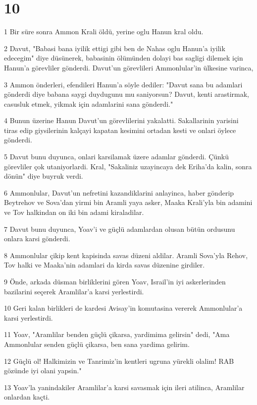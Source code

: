 \chapter{10}

\par 1 Bir süre sonra Ammon Krali öldü, yerine oglu Hanun kral oldu.
\par 2 Davut, "Babasi bana iyilik ettigi gibi ben de Nahas oglu Hanun'a iyilik edecegim" diye düsünerek, babasinin ölümünden dolayi bas sagligi dilemek için Hanun'a görevliler gönderdi. Davut'un görevlileri Ammonlular'in ülkesine varinca,
\par 3 Ammon önderleri, efendileri Hanun'a söyle dediler: "Davut sana bu adamlari gönderdi diye babana saygi duydugunu mu saniyorsun? Davut, kenti arastirmak, casusluk etmek, yikmak için adamlarini sana gönderdi."
\par 4 Bunun üzerine Hanun Davut'un görevlilerini yakalatti. Sakallarinin yarisini tiras edip giysilerinin kalçayi kapatan kesimini ortadan kesti ve onlari öylece gönderdi.
\par 5 Davut bunu duyunca, onlari karsilamak üzere adamlar gönderdi. Çünkü görevliler çok utaniyorlardi. Kral, "Sakaliniz uzayincaya dek Eriha'da kalin, sonra dönün" diye buyruk verdi.
\par 6 Ammonlular, Davut'un nefretini kazandiklarini anlayinca, haber gönderip Beytrehov ve Sova'dan yirmi bin Aramli yaya asker, Maaka Krali'yla bin adamini ve Tov halkindan on iki bin adami kiraladilar.
\par 7 Davut bunu duyunca, Yoav'i ve güçlü adamlardan olusan bütün ordusunu onlara karsi gönderdi.
\par 8 Ammonlular çikip kent kapisinda savas düzeni aldilar. Aramli Sova'yla Rehov, Tov halki ve Maaka'nin adamlari da kirda savas düzenine girdiler.
\par 9 Önde, arkada düsman birliklerini gören Yoav, Israil'in iyi askerlerinden bazilarini seçerek Aramlilar'a karsi yerlestirdi.
\par 10 Geri kalan birlikleri de kardesi Avisay'in komutasina vererek Ammonlular'a karsi yerlestirdi.
\par 11 Yoav, "Aramlilar benden güçlü çikarsa, yardimima gelirsin" dedi, "Ama Ammonlular senden güçlü çikarsa, ben sana yardima gelirim.
\par 12 Güçlü ol! Halkimizin ve Tanrimiz'in kentleri ugruna yürekli olalim! RAB gözünde iyi olani yapsin."
\par 13 Yoav'la yanindakiler Aramlilar'a karsi savasmak için ileri atilinca, Aramlilar onlardan kaçti.
